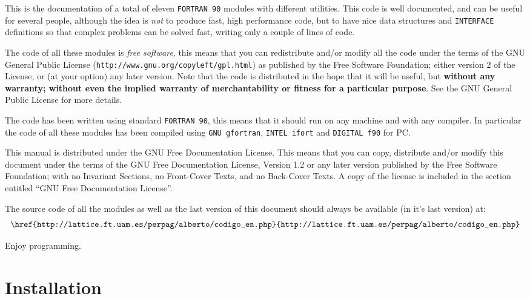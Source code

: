 
This is the documentation of a total of eleven \texttt{FORTRAN 90}
modules with different utilities. This code is well documented, and
can be useful for several people, although the idea is \emph{not} to
produce fast, high performance code, but to have nice data structures
and \texttt{INTERFACE} definitions so that complex problems can be
solved fast, writing only a couple of lines of code. 

The code of all these modules is \emph{free software}, this means that
you can redistribute and/or modify all the code under the terms of the
GNU General Public License (\texttt{http://www.gnu.org/copyleft/gpl.html})
as published by the Free Software Foundation; either version 2
of the License, or (at your option) any later version. Note that the
code is distributed in the hope that it will be useful, but
\textbf{without any warranty; without even the implied warranty of
  merchantability or fitness for a particular purpose}.  See the GNU
General Public License for more details. 

The code has been written using standard \texttt{FORTRAN 90}, this
means that it should run on any machine and with any compiler. In
particular the code of all these modules has been compiled using
\texttt{GNU gfortran}, \texttt{INTEL ifort} and \texttt{DIGITAL f90}
for PC.

This manual is distributed under the GNU Free Documentation
License. This means that you can copy, distribute and/or modify this
document under the terms of the GNU Free Documentation License,
Version 1.2 or any later version published by the Free Software
Foundation; with no Invariant Sections, no Front-Cover Texts, and no
Back-Cover Texts.  A copy of the license is included in the section
entitled ``GNU Free Documentation License''.

The source code of all the modules as well as the last version of this
document should always be available (in it's last version) at:
\begin{displaymath}
  \texttt{\href{http://lattice.ft.uam.es/perpag/alberto/codigo\_en.php}{\texttt{http://lattice.ft.uam.es/perpag/alberto/codigo\_en.php}}}
\end{displaymath}

Enjoy programming.

\section*{Installation}

